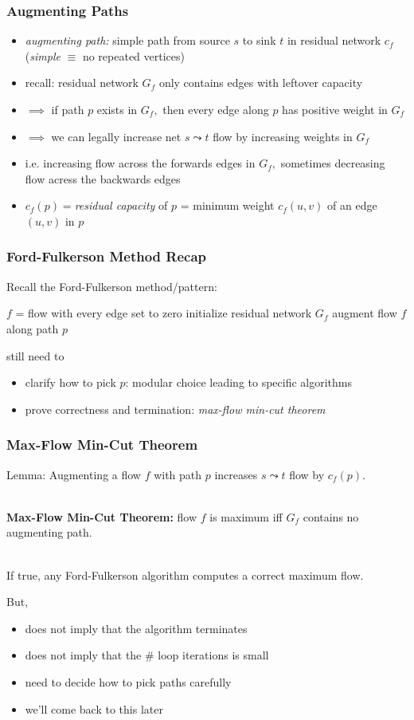 \documentclass{beamer}
\newcommand{\stanza}{ \\~\ }
\begin{document}
\begin{frame} \frametitle{Augmenting Paths}
\begin{itemize}
  \item \emph{augmenting path:} simple path from source $s$ to sink $t$ in residual
    network $c_f$
    (\emph{simple} $\equiv$ no repeated vertices)
  \item recall: residual network $G_f$ only contains edges with leftover capacity
  \item $\implies$ if path $p$ exists in $G_f,$ then every edge along $p$
    has positive weight in $G_f$
  \item $\implies$ we can legally increase net $s \leadsto t$ flow by increasing
    weights in $G_f$
  \item i.e. increasing flow across the forwards edges in $G_f,$ sometimes
    decreasing flow acress the backwards edges
  \item $c_f(p) = $\emph{residual capacity} of $p$ = minimum weight
    $c_f(u,v)$ of an edge $(u, v)$ in $p$
\end{itemize}
\end{frame}

\begin{frame} \frametitle{Ford-Fulkerson Method Recap}
Recall the Ford-Fulkerson method/pattern:
{\footnotesize
\begin{algorithmic}[1]
  \State $f$ = flow with every edge set to zero
  \State initialize residual network $G_f$
    \State augment flow $f$ along path $p$
  \EndWhile
  \State {}
  \EndFunction
\end{algorithmic}
}
\vspace{.5cm}
still need to
\begin{itemize}
  \item clarify how to pick $p$: modular choice leading to specific algorithms
  \item prove correctness and termination: \emph{max-flow min-cut theorem}
\end{itemize}
\end{frame}

\begin{frame} \frametitle{Max-Flow Min-Cut Theorem}
Lemma: Augmenting a flow $f$ with path $p$ increases $s \leadsto t$ flow by $c_f(p).$
\stanza

\textbf{Max-Flow Min-Cut Theorem:} flow $f$ is maximum iff $G_f$ contains no augmenting path.
\stanza

If true, any Ford-Fulkerson algorithm computes a correct maximum flow.

But,
\begin{itemize}
  \item does not imply that the algorithm terminates
  \item does not imply that the \# loop iterations is small
  \item need to decide how to pick paths carefully
  \item we'll come back to this later
\end{itemize}
\end{frame}
\end{document}

